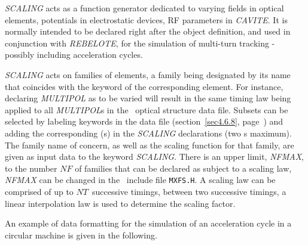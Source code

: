 \textsl{SCALING} acts as a function generator dedicated to varying 
fields in optical elements, potentials in 
electrostatic devices, RF parameters in \textsl{CAVITE}. It is normally intended
to be declared right after the object definition, and used in conjunction 
with \textsl{REBELOTE}, for the simulation of multi-turn tracking 
- possibly including  acceleration   cycles.  

\bigskip

\noindent\textsl{SCALING} acts on families of elements,  a family being
designated by its name that  coincides with 
the keyword of the corresponding element. For instance, declaring \textsl{MULTIPOL} 
as to be varied will result in the same timing law being applied to all 
\textsl{MULTIPOL}s in the \zgou\ optical structure data file. Subsets can be selected by 
labeling keywords in the data file (section~\ref{sec4.6.8}, page~\pageref{sec4.6.8}) 
and adding the corresponding \LABEL(s) 
in the \textsl{SCALING} declarations (two \LABEL s maximum). The family name of concern, 
as well as the scaling function for  that  family,  are given as
input data to the keyword \textsl{SCALING}. There is an upper limit, \textsl{NFMAX}, to the number  $NF$ 
of families that can be declared
as subject to a scaling law,  \textsl{NFMAX} can be changed in the \FORTRAN\ include file \texttt{MXFS.H}. 
A scaling law can be comprised  of up to $NT$~successive timings,  
between two successive timings, a linear interpolation law is used to determine the scaling factor. 

\bigskip

\noindent An example of data formatting for the simulation of an acceleration cycle in a circular 
machine is given in the following. 

\bigskip

